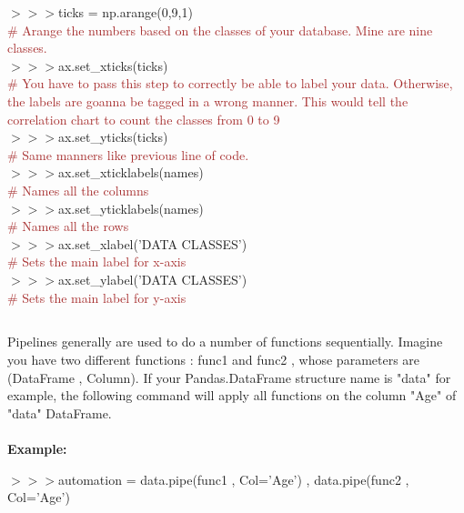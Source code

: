 \documentclass[a4paper,18pt]{article}
\begin{document}
$>>>$ticks = np.arange(0,9,1)\\{\textcolor{brown}{\# Arange the numbers based on the classes of your database. Mine are nine classes.}}\\

$>>>$ax.set\_xticks(ticks)\\{\textcolor{brown}{\# You have to pass this step to correctly be able to label your data. Otherwise, the labels are goanna be tagged in a wrong manner. This would tell the correlation chart to count the classes from 0 to 9}}\\

$>>>$ax.set\_yticks(ticks)\\{\textcolor{brown}{\# Same manners like previous line of code.}}\\

$>>>$ax.set\_xticklabels(names)\\{\textcolor{brown}{\# Names all the columns}}\\

$>>>$ax.set\_yticklabels(names)\\{\textcolor{brown}{\# Names all the rows}}\\

$>>>$ax.set\_xlabel('DATA CLASSES')\\{\textcolor{brown}{\# Sets the main label for x-axis}}\\

$>>>$ax.set\_ylabel('DATA CLASSES')\\{\textcolor{brown}{\# Sets the main label for y-axis}}\\


\subsection{\colorbox {matgreen}{\color{white}{\large Pipeline in pandas}}}
Pipelines generally are used to do a number of functions sequentially. Imagine you have two different functions : func1 and func2 , whose parameters are (DataFrame , Column). If your Pandas.DataFrame structure name is "data" for example, the following command will apply all functions on the column "Age" of "data" DataFrame. \\\\
\textbf{Example:\\}

$>>>$automation = data.pipe(func1 , Col='Age') , data.pipe(func2 , Col='Age')\\
\end{document}
